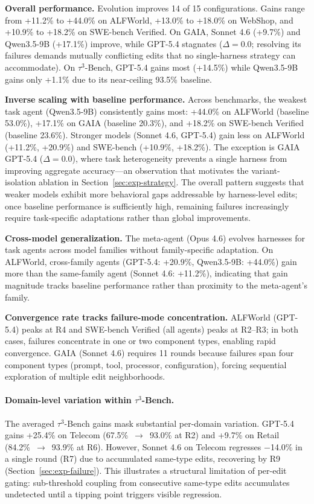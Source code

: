 \textbf{Overall performance.} Evolution improves 14 of 15 configurations. Gains range from +11.2\% to +44.0\% on ALFWorld, +13.0\% to +18.0\% on WebShop, and +10.9\% to +18.2\% on SWE-bench Verified. On GAIA, Sonnet 4.6 (+9.7\%) and Qwen3.5-9B (+17.1\%) improve, while GPT-5.4 stagnates ($\Delta{=}0.0$; resolving its failures demands mutually conflicting edits that no single-harness strategy can accommodate). On $\tau^3$-Bench, GPT-5.4 gains most (+14.5\%) while Qwen3.5-9B gains only +1.1\% due to its near-ceiling 93.5\% baseline.

\textbf{Inverse scaling with baseline performance.} Across benchmarks, the weakest task agent (Qwen3.5-9B) consistently gains most: +44.0\% on ALFWorld (baseline 53.0\%), +17.1\% on GAIA (baseline 20.3\%), and +18.2\% on SWE-bench Verified (baseline 23.6\%). Stronger models (Sonnet 4.6, GPT-5.4) gain less on ALFWorld (+11.2\%, +20.9\%) and SWE-bench (+10.9\%, +18.2\%). The exception is GAIA GPT-5.4 ($\Delta{=}0.0$), where task heterogeneity prevents a single harness from improving aggregate accuracy---an observation that motivates the variant-isolation ablation in Section~\ref{sec:exp-strategy}. The overall pattern suggests that weaker models exhibit more behavioral gaps addressable by harness-level edits; once baseline performance is sufficiently high, remaining failures increasingly require task-specific adaptations rather than global improvements.

\textbf{Cross-model generalization.} The meta-agent (Opus 4.6) evolves harnesses for task agents across model families without family-specific adaptation. On ALFWorld, cross-family agents (GPT-5.4: +20.9\%, Qwen3.5-9B: +44.0\%) gain more than the same-family agent (Sonnet 4.6: +11.2\%), indicating that gain magnitude tracks baseline performance rather than proximity to the meta-agent's family.

\textbf{Convergence rate tracks failure-mode concentration.} ALFWorld (GPT-5.4) peaks at R4 and SWE-bench Verified (all agents) peaks at R2--R3; in both cases, failures concentrate in one or two component types, enabling rapid convergence. GAIA (Sonnet 4.6) requires 11 rounds because failures span four component types (prompt, tool, processor, configuration), forcing sequential exploration of multiple edit neighborhoods.

\paragraph{Domain-level variation within $\tau^3$-Bench.}
The averaged $\tau^3$-Bench gains mask substantial per-domain variation. GPT-5.4 gains +25.4\% on Telecom (67.5\%~$\to$~93.0\% at R2) and +9.7\% on Retail (84.2\%~$\to$~93.9\% at R6). However, Sonnet 4.6 on Telecom regresses $-$14.0\% in a single round (R7) due to accumulated same-type edits, recovering by R9 (Section~\ref{sec:exp-failure}). This illustrates a structural limitation of per-edit gating: sub-threshold coupling from consecutive same-type edits accumulates undetected until a tipping point triggers visible regression.

